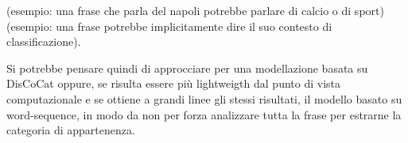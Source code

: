 \documentclass{report}
\begin{document}
        \leavevmode\newline
        (esempio: una frase che parla del napoli potrebbe parlare di calcio o di sport)
        (esempio: una frase potrebbe implicitamente dire il suo contesto di classificazione).

        \leavevmode\newline
        Si potrebbe pensare quindi di approcciare per una modellazione basata su DisCoCat oppure, se risulta essere più lightweigth dal punto di vista computazionale e se
        ottiene a grandi linee gli stessi risultati, il modello basato su word-sequence, in modo da non per forza analizzare tutta la frase per estrarne la categoria di appartenenza.
\end{document}
